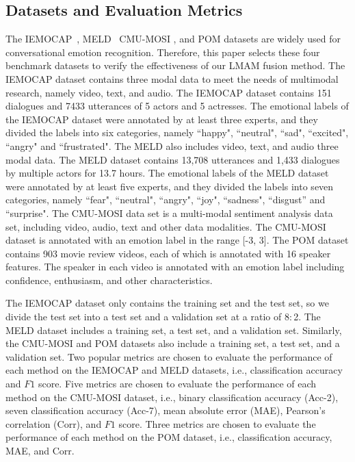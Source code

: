 {{\subsection{Datasets and Evaluation Metrics}
{The IEMOCAP~\cite{busso2008iemocap}, MELD~\cite{poria2018meld} CMU-MOSI \cite{zadeh2016mosi}, and POM \cite{park2014computational} datasets are widely used for conversational emotion recognition.} Therefore, {this paper selects these four benchmark datasets} to verify the effectiveness of our LMAM fusion method. The IEMOCAP dataset contains three modal data to meet the needs of multimodal research, namely video, text, and audio. The IEMOCAP dataset contains 151 dialogues and 7433 utterances of 5 actors and 5 actresses. The emotional labels of the IEMOCAP dataset were annotated by at least three experts, and they divided the labels into six categories, namely ``happy", ``neutral", ``sad", ``excited", ``angry" and ``frustrated". The MELD also includes video, text, and audio three modal data. The MELD dataset contains 13,708 utterances and 1,433 dialogues by multiple actors for 13.7 hours. The emotional labels of the MELD dataset were annotated by at least five experts, and they divided the labels into seven categories, namely ``fear", ``neutral", ``angry", ``joy", ``sadness", ``disgust” and ``surprise". {The CMU-MOSI data set is a multi-modal sentiment analysis data set, including video, audio, text and other data modalities. The CMU-MOSI dataset is annotated with an emotion label in the range [-3, 3]. The POM dataset contains 903 movie review videos, each of which is annotated with 16 speaker features. The speaker in each video is annotated with an emotion label including confidence, enthusiasm, and other characteristics.}

The IEMOCAP dataset only contains the training set and the test set, so we divide the test set into a test set and a validation set at a ratio of 8$:$2. The MELD dataset includes a training set, a test set, and a validation set. {Similarly, the CMU-MOSI and POM datasets also include a training set, a test set, and a validation set. Two popular metrics are chosen to evaluate the performance of each method on the IEMOCAP and MELD datasets, i.e., classification accuracy and $F1$ score. Five metrics are chosen to evaluate the performance of each method on the CMU-MOSI dataset, i.e., binary classification accuracy (Acc-2),  seven classification accuracy (Acc-7), mean absolute error (MAE), Pearson’s correlation (Corr), and $F1$ score. Three metrics are chosen to evaluate the performance of each method on the POM dataset, i.e., classification accuracy, MAE, and Corr.}

}}

